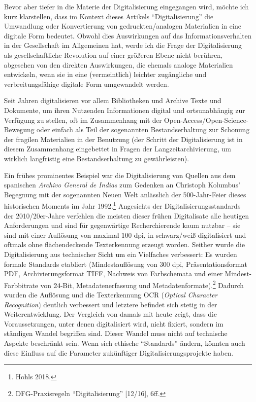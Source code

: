 \documentclass[a4paper,
fontsize=11pt,
oneside,
numbers=noperiodatend,
parskip=half-,
bibliography=totoc,
final
]{scrartcl}
\begin{document}
Bevor aber tiefer in die Materie der Digitalisierung eingegangen wird,
möchte ich kurz klarstellen, dass im Kontext dieses Artikels
\enquote{Digitalisierung} die Umwandlung oder Konvertierung von
gedruckten/analogen Materialien in eine digitale Form bedeutet. Obwohl
dies Auswirkungen auf das Informationsverhalten in der Gesellschaft im
Allgemeinen hat, werde ich die Frage der Digitalisierung als
gesellschaftliche Revolution auf einer größeren Ebene nicht berühren,
abgesehen von den direkten Auswirkungen, die ehemals analoge Materialien
entwickeln, wenn sie in eine (vermeintlich) leichter zugängliche und
verbreitungsfähige digitale Form umgewandelt werden.

Seit Jahren digitalisieren vor allem Bibliotheken und Archive Texte und
Dokumente, um ihren Nutzenden Informationen digital und ortsunabhängig
zur Verfügung zu stellen, oft im Zusammenhang mit der
Open-Access/Open-Science-Bewegung oder einfach als Teil der sogenannten
Bestandserhaltung zur Schonung der fragilen Materialien in der Benutzung
(der Schritt der Digitalisierung ist in diesem Zusammenhang eingebettet
in Fragen der Langzeitarchivierung, um wirklich langfristig eine
Bestandserhaltung zu gewährleisten).

Ein frühes prominentes Beispiel war die Digitalisierung von Quellen aus
dem spanischen \emph{Archivo General de Indias} zum Gedenken an
Christoph Kolumbus' Begegnung mit der sogenannten Neuen Welt anlässlich
der 500-Jahr-Feier dieses historischen Moments im Jahr 1992.\footnote{Hohls
  2018.} Angesichts der Digitalisierungsstandards der 2010/20er-Jahre
verfehlen die meisten dieser frühen Digitalisate alle heutigen
Anforderungen und sind für gegenwärtige Recherchierende kaum nutzbar --
sie sind mit einer Auflösung von maximal 100 dpi, in schwarz/weiß
digitalisiert und oftmals ohne flächendeckende Texterkennung erzeugt
worden. Seither wurde die Digitalisierung aus technischer Sicht um ein
Vielfaches verbessert: Es wurden formale Standards etabliert
(Mindestauflösung von 300 dpi, Präsentationsformat PDF,
Archivierungsformat TIFF, Nachweis von Farbschemata und einer
Mindest-Farbbitrate von 24-Bit, Metadatenerfassung und
Metadatenformate).\footnote{DFG-Praxisregeln \enquote{Digitalisierung}
  {[}12/16{]}, 6ff.} Dadurch wurden die Auflösung und die Texterkennung
OCR (\emph{Optical Character Recognition}) deutlich verbessert und
letztere befindet sich stetig in der Weiterentwicklung. Der Vergleich
von damals mit heute zeigt, dass die Voraussetzungen, unter denen
digitalisiert wird, nicht fixiert, sondern im ständigen Wandel begriffen
sind. Dieser Wandel muss nicht auf technische Aspekte beschränkt sein.
Wenn sich ethische \enquote{Standards} ändern, könnten auch diese
Einfluss auf die Parameter zukünftiger Digitalisierungsprojekte haben.
\end{document}

